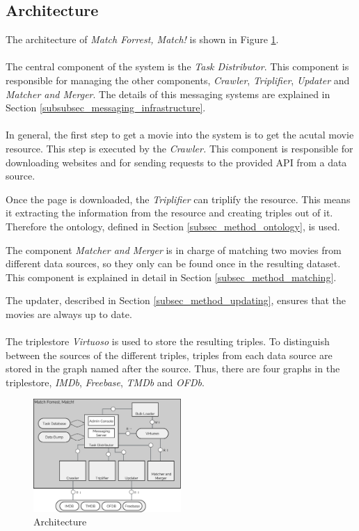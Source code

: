 \subsection{Architecture}
\label{subsec_method_architecture}

The architecture of \emph{Match Forrest, Match!} is shown in Figure \ref{fig_architecture}.
\\ \\
The central component of the system is the \textit{Task Distributor}.
This component is responsible for managing the other components, \textit{Crawler}, \textit{Triplifier}, \textit{Updater} and \textit{Matcher and Merger}.
The details of this messaging systems are explained in Section \ref{subsubsec_messaging_infrastructure}.
\\ \\
In general, the first step to get a movie into the system is to get the acutal movie resource.
This step is executed by the \textit{Crawler.}
This component is responsible for downloading websites and for sending requests to the provided API from a data source.

Once the page is downloaded, the \textit{Triplifier} can triplify the resource.
This means it extracting the information from the resource and creating triples out of it.
Therefore the ontology, defined in Section \ref{subsec_method_ontology}, is used.

The component \textit{Matcher and Merger} is in charge of matching two movies from different data sources, so they only can be found once in the resulting dataset.
This component is explained in detail in Section \ref{subsec_method_matching}.

The updater, described in Section \ref{subsec_method_updating}, ensures that the movies are always up to date.
\\ \\
The triplestore \textit{Virtuoso} is used to store the resulting triples.
To distinguish between the sources of the different triples, triples from each data source are stored in the graph named after the source.
Thus, there are four graphs in the triplestore, \textit{IMDb}, \textit{Freebase}, \textit{TMDb} and \textit{OFDb}.

\begin{figure}[ht]
  \begin{center}
  \includegraphics[width=0.5\textwidth]{images/architecture.pdf}
  \end{center}
  \caption{Architecture}
  \label{fig_architecture}
\end{figure}

